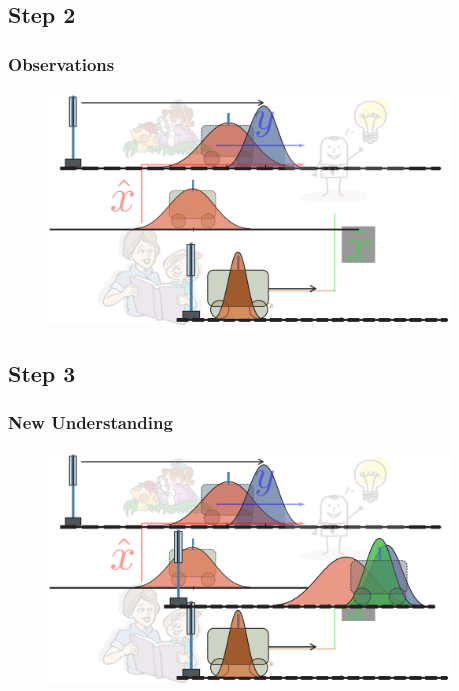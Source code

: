 \subsection{Step 2}
\begin{frame}\pw\Large
\frametitle{Observations}
\framesubtitle{}
\begin{figure}
\includegraphics[width=0.95\textwidth]{figs/WFAR11_UCP_Update_Prediction_Process-2.pdf}
\end{figure}
\end{frame}


\subsection{Step 3}
\begin{frame}\pw\Large
\frametitle{New Understanding}
\framesubtitle{}
\begin{figure}
\includegraphics[width=0.95\textwidth]{figs/WFAR11_UCP_Update_Prediction_Process-3.pdf}
\end{figure}
\end{frame}




